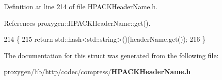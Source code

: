 Definition at line 214 of file H\+P\+A\+C\+K\+Header\+Name.\+h.



References proxygen\+::\+H\+P\+A\+C\+K\+Header\+Name\+::get().


\begin{DoxyCode}
214                                                                      \{
215     \textcolor{keywordflow}{return} std::hash<std::string>()(headerName.get());
216   \}
\end{DoxyCode}


The documentation for this struct was generated from the following file\+:\begin{DoxyCompactItemize}
\item 
proxygen/lib/http/codec/compress/{\bf H\+P\+A\+C\+K\+Header\+Name.\+h}\end{DoxyCompactItemize}
